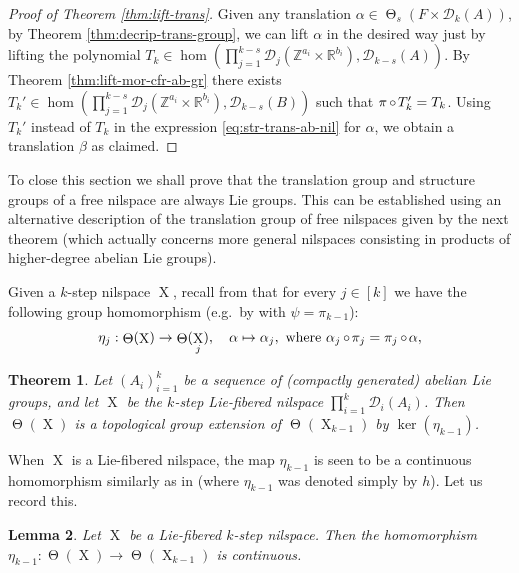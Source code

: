 \documentclass[a4paper,12pt,reqno]{amsart}
\newtheorem{theorem}{Theorem}[section]
\newtheorem{lemma}[theorem]{Lemma}
\theoremstyle{definition}
\def\to{\rightarrow}
\newcommand{\mc}{\mathcal}
\newcommand{\mb}{\mathbb}
\DeclareMathOperator{\tran}{\Theta}
\DeclareMathOperator{\ns}{X}
\DeclareMathOperator{\co}{\circ\hspace{-0.02 cm}}
\begin{document}
\begin{proof}[Proof of Theorem \ref{thm:lift-trans}]
Given any translation $\alpha\in \tran_s(F\times \mc{D}_k(A))$, by Theorem \ref{thm:decrip-trans-group}, we can lift $\alpha$ in the desired way just by lifting the polynomial $T_k\in \hom(\prod_{j=1}^{k-s}\mc{D}_j(\mb{Z}^{a_i}\times \mb{R}^{b_i}),\mc{D}_{k-s}(A))$. By Theorem \ref{thm:lift-mor-cfr-ab-gr} there exists $T_k'\in \hom(\prod_{j=1}^{k-s}\mc{D}_j(\mb{Z}^{a_i}\times \mb{R}^{b_i}),\mc{D}_{k-s}(B))$ such that $\pi\co T_k'=T_k$. Using $T_k'$ instead of $T_k$ in the expression \eqref{eq:str-trans-ab-nil} for $\alpha$, we obtain a translation $\beta$ as claimed.
\end{proof}

\noindent To close this section we shall prove that the translation group and structure groups of a free nilspace are always Lie groups. This can be established using an alternative description of the translation group of free nilspaces given by the next theorem (which actually concerns more general nilspaces consisting in products of higher-degree abelian Lie groups).

Given a $k$-step nilspace $\ns$, recall from \cite[Definition 3.3.1 (ii)]{Cand:Notes1} that for every $j\in [k]$ we have the following group homomorphism (e.g.\ by \cite[Lemma 1.5]{CGSS} with $\psi=\pi_{k-1}$): 
\begin{equation}\label{eq:etaj}
\eta_j:\tran(\ns)\to \tran(\ns_j),\quad \alpha\mapsto \alpha_j,\textrm{ where } \alpha_j\co \pi_j = \pi_j\co \alpha,
\end{equation}

\begin{theorem}\label{thm:freetransLie}
Let $(A_i)_{i=1}^k$ be a sequence of (compactly generated) abelian Lie groups, and let $\ns$ be the $k$-step Lie-fibered nilspace $\prod_{i=1}^k \mc{D}_i(A_i)$. Then $\tran(\ns)$ is a topological group extension of  $\tran(\ns_{k-1})$ by $\ker(\eta_{k-1})$.
\end{theorem}
\noindent When $\ns$ is a Lie-fibered nilspace, the map $\eta_{k-1}$ is seen to be a continuous homomorphism similarly as in \cite[Lemma 2.9.3]{Cand:Notes2} (where $\eta_{k-1}$ was denoted simply by $h$). Let us record this.

\begin{lemma}\label{lem:h-is-cont}
Let $\ns$ be a Lie-fibered $k$-step nilspace. Then the homomorphism $\eta_{k-1}:\tran(\ns)\to \tran(\ns_{k-1})$ is continuous.
\end{lemma}
\end{document}
